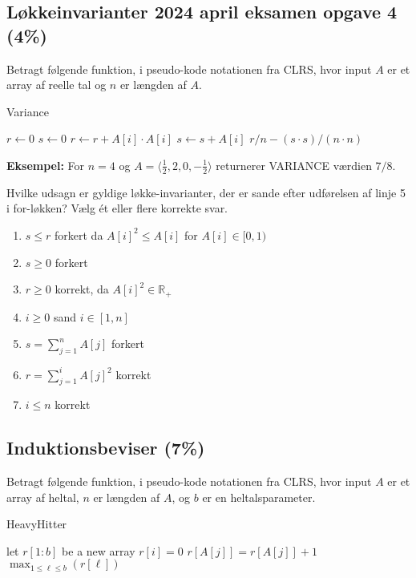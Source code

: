 \documentclass{article}
\theoremstyle{definition}
\begin{document}
\subsection{Løkkeinvarianter 2024 april eksamen opgave 4 (4\%)}

Betragt følgende funktion, i pseudo-kode notationen fra CLRS, hvor input $A$ er et array af reelle tal og $n$ er længden af $A$.

\begin{algorithm}
\caption{Variance}
\begin{algorithmic}[1]
\State $r \leftarrow 0$
\State $s \leftarrow 0$
    \State $r \leftarrow r + A[i] \cdot A[i]$
    \State $s \leftarrow s + A[i]$
\EndFor
\State \Return $r/n - (s \cdot s)/(n \cdot n)$
\end{algorithmic}
\end{algorithm}

\textbf{Eksempel:} For $n = 4$ og $A = \langle \frac{1}{2}, 2, 0, -\frac{1}{2} \rangle$ returnerer VARIANCE værdien $7/8$.

Hvilke udsagn er gyldige løkke-invarianter, der er sande efter udførelsen af linje 5 i for-løkken? Vælg ét eller flere korrekte svar.

\begin{enumerate}
    \item $s \leq r$ forkert da $A[i]^2 \leq A[i]$ for $A[i] \in [0,1)$ 
    \item $s \geq 0$ forkert
    \item $r \geq 0$ korrekt, da $A[i]^2 \in \mathbb{R}_{+}$ 
    \item $i \geq 0$ sand $i \in [1, n]$
    \item $s = \sum_{j=1}^n A[j]$ forkert 
    \item $r = \sum_{j=1}^i A[j]^2$ korrekt
    \item $i \leq n$ korrekt 
\end{enumerate}


\subsection{Induktionsbeviser (7\%)}
Betragt følgende funktion, i pseudo-kode notationen fra CLRS, hvor input $A$ er et array af heltal, $n$ er længden af $A$, og $b$ er en heltalsparameter.

\begin{algorithm}
\caption{HeavyHitter}
\begin{algorithmic}[1]
\State let $r[1:b]$ be a new array
    \State $r[i] = 0$
\EndFor
{}
        \State $r[A[j]] = r[A[j]] + 1$
    \EndIf
\EndFor
\State \Return $\max_{1 \leq \ell \leq b}(r[\ell])$
\end{algorithmic}
\end{algorithm}
\end{document}
